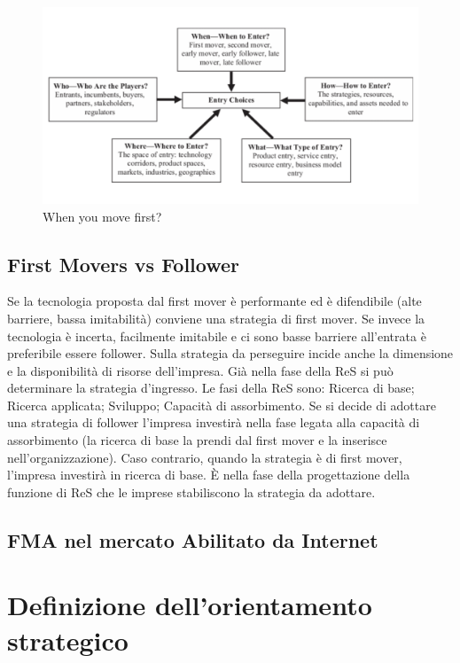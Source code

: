 \documentclass{article}
\begin{document}
\begin{figure}[h!]
	\centering
	\includegraphics[scale=0.4]{images/Entry_choice.png}
	\caption{When you move first?}
	\label{fig:entry_choice}
\end{figure}

\subsection{First Movers vs Follower}
Se la tecnologia proposta dal first mover è performante ed è difendibile (alte barriere, bassa
imitabilità) conviene una strategia di first mover.
Se invece la tecnologia è incerta, facilmente imitabile e ci sono basse barriere all’entrata è
preferibile essere follower.
Sulla strategia da perseguire incide anche la dimensione e la disponibilità di risorse dell’impresa.
Già nella fase della ReS si può determinare la strategia d’ingresso. Le fasi della ReS sono:
Ricerca di base;
Ricerca applicata;
Sviluppo;
Capacità di assorbimento.
Se si decide di adottare una strategia di follower l’impresa investirà nella fase legata alla capacità
di assorbimento (la ricerca di base la prendi dal first mover e la inserisce nell’organizzazione).
Caso contrario, quando la strategia è di first mover, l’impresa investirà in ricerca di base.
È nella fase della progettazione della funzione di ReS che le imprese stabiliscono la strategia da
adottare.

\subsection 
{FMA nel mercato Abilitato da Internet}

\section{Definizione dell'orientamento strategico}
\end{document}
